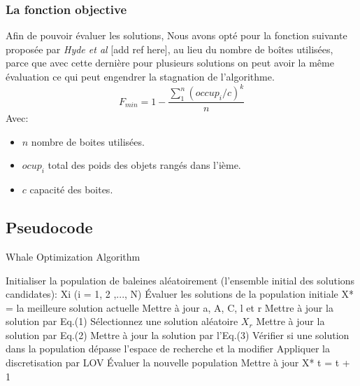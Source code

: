 \documentclass[12pt]{article}
\begin{document}
\subsubsection{La fonction objective }
Afin de pouvoir évaluer les solutions, Nous avons opté pour la fonction suivante proposée par \emph{Hyde et al} [add ref here], au lieu du nombre de boîtes utilisées, parce que avec cette dernière pour plusieurs solutions on peut avoir la même évaluation ce qui peut engendrer la stagnation de l’algorithme.
\[ F_{min} = 1 - \frac{\sum_{1}^{n} (occup_i / c)^k}{n}\]
Avec:
\begin{itemize}
    \item \(n\) nombre de boites utilisées.
    \item \(ocup_i\) total des poids des objets rangés dans l’ième.
    \item \(c\) capacité des boites.
    
\end{itemize}
\subsection{Pseudocode}
\begin{algorithm}[H]
    \caption{Whale Optimization Algorithm}
    \begin{algorithmic}
        \STATE Initialiser la population de baleines aléatoirement (l'ensemble initial des solutions candidates): Xi (i = 1, 2 ,..., N)\;
        \STATE Évaluer les solutions de la population initiale\;
        \STATE X* = la meilleure solution actuelle\;
                \STATE Mettre à jour a, A, C, l et r\;
                        \STATE Mettre à jour la solution par Eq.(1)\;
                    \ELSE
                        \STATE Sélectionnez une solution aléatoire \(X_r\)\;
                        \STATE Mettre à jour la solution par Eq.(2)\;
                    \ENDIF
                \ELSE 
                    \STATE Mettre à jour la solution par l'Eq.(3)\;
                \ENDIF
            \ENDFOR
            \STATE Vérifier si une solution dans la population dépasse l'espace de recherche et la modifier\;
            \STATE Appliquer la discretisation par LOV\;
            \STATE Évaluer la nouvelle population\;
            \STATE Mettre à jour X* \;
            \STATE t = t + 1\;
        \ENDWHILE
    \end{algorithmic}
\end{algorithm}
\end{document}
